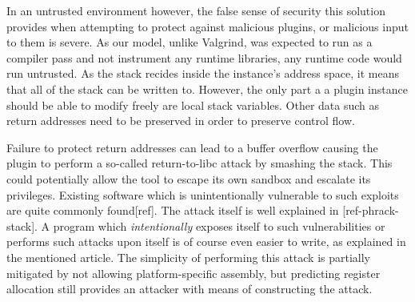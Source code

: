 In an untrusted environment however, the false sense of security this solution
provides when attempting to protect against malicious plugins, or malicious
input to them is severe.
As our model, unlike Valgrind, was expected to run as a compiler pass and not
instrument any runtime libraries, any runtime code would run untrusted.
As the stack recides inside the instance's address space, it means that all of
the stack can be written to.
However, the only part a a plugin instance should be able to modify freely are
local stack variables.
Other data such as return addresses need to be preserved in order to preserve
control flow.

Failure to protect return addresses can lead to a buffer overflow causing the
plugin to perform a so-called return-to-libc attack by smashing the stack.
This could potentially allow the tool to escape its own sandbox and escalate its
privileges.
Existing software which is unintentionally vulnerable to such exploits are quite
commonly found[ref].
The attack itself is well explained in [ref-phrack-stack].
A program which \emph{intentionally} exposes itself to such vulnerabilities or
performs such attacks upon itself is of course even easier to write, as
explained in the mentioned article.
The simplicity of performing this attack is partially mitigated by not allowing
platform-specific assembly, but predicting register allocation still provides an
attacker with means of constructing the attack.
